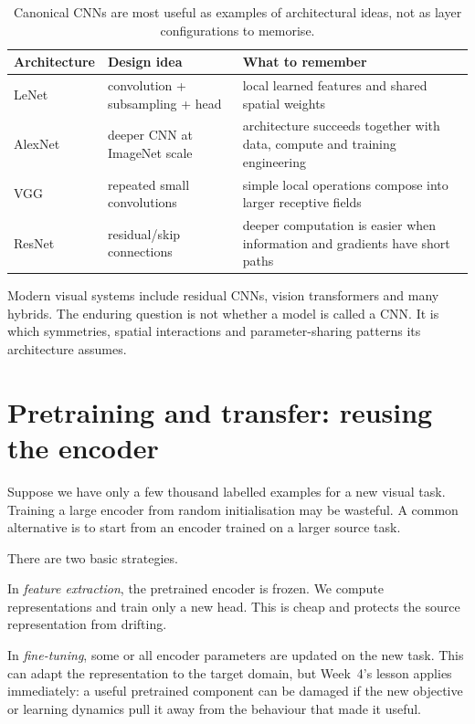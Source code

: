 \begin{table}[ht]
\centering
\small
\begin{tabular}{p{}p{}p{}}
\toprule
Architecture & Design idea & What to remember \\
\midrule
LeNet & convolution + subsampling + head & local learned features and shared spatial weights \\
AlexNet & deeper CNN at ImageNet scale & architecture succeeds together with data, compute and training engineering \\
VGG & repeated small convolutions & simple local operations compose into larger receptive fields \\
ResNet & residual/skip connections & deeper computation is easier when information and gradients have short paths \\
\bottomrule
\end{tabular}
\caption{Canonical CNNs are most useful as examples of architectural ideas, not as layer configurations to memorise.}
\label{tab:week5-cnn-history}
\end{table}

Modern visual systems include residual CNNs, vision transformers and many hybrids. The enduring question is not whether a model is called a CNN. It is which symmetries, spatial interactions and parameter-sharing patterns its architecture assumes.

\section{Pretraining and transfer: reusing the encoder}

Suppose we have only a few thousand labelled examples for a new visual task. Training a large encoder from random initialisation may be wasteful. A common alternative is to start from an encoder trained on a larger source task.

There are two basic strategies.

In \emph{feature extraction}, the pretrained encoder is frozen. We compute representations and train only a new head. This is cheap and protects the source representation from drifting.

In \emph{fine-tuning}, some or all encoder parameters are updated on the new task. This can adapt the representation to the target domain, but Week~4's lesson applies immediately: a useful pretrained component can be damaged if the new objective or learning dynamics pull it away from the behaviour that made it useful.

